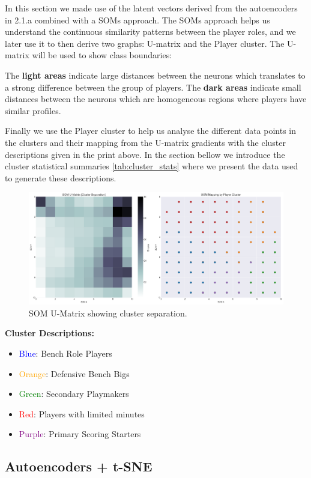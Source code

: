 \documentclass{article}
\begin{document}
In this section we made use of the latent vectors derived from the autoencoders in 2.1.a combined with a SOMs approach.
The SOMs approach helps us understand the continuous similarity patterns between the player roles, and we later use it to then derive two graphs: U-matrix and the Player cluster. The U-matrix will be used to show class boundaries:

The {\bf light areas} indicate large distances between the neurons which translates to a strong difference between the group of players.
The {\bf dark areas} indicate small distances between the neurons which are homogeneous regions where players have similar profiles.

Finally we use the Player cluster to help us analyse the different data points in the clusters and their mapping from the U-matrix gradients with the cluster descriptions given in the print above. In the section bellow we introduce the cluster statistical summaries \ref{tab:cluster_stats} where we present the data used to generate these descriptions.

\begin{figure}[h]
    \centering
    \includegraphics[width=0.7\linewidth]{media/2b.png}
    \caption{SOM U-Matrix showing cluster separation.}
\end{figure}

{\bf Cluster Descriptions:}
\begin{itemize}
    \item \textcolor{blue}{Blue}: Bench Role Players
    \item \textcolor{orange}{Orange}: Defensive Bench Bigs
    \item \textcolor{green}{Green}: Secondary Playmakers
    \item \textcolor{red}{Red}: Players with limited minutes
    \item \textcolor{purple}{Purple}: Primary Scoring Starters
\end{itemize}

\subsection{Autoencoders + t-SNE}
\end{document}
